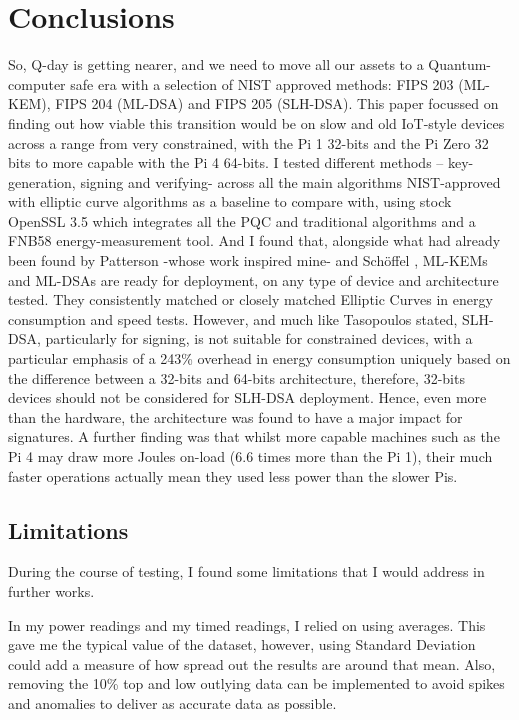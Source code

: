 \documentclass[11pt, letterpaper]{article}
\begin{document}
\section{Conclusions}
So, Q-day is getting nearer, and we need to move all our assets to a Quantum-computer safe era with a selection of NIST approved methods: FIPS 203 (ML-KEM), FIPS 204 (ML-DSA) and FIPS 205 (SLH-DSA). This paper focussed on finding out how viable this transition would be on slow and old IoT-style devices across a range from very constrained, with the Pi 1 32-bits and the Pi Zero 32 bits to more capable with the Pi 4 64-bits. I tested different methods – key-generation, signing and verifying- across all the main algorithms NIST-approved with elliptic curve algorithms as a baseline to compare with, using stock OpenSSL 3.5 which integrates all the PQC and traditional algorithms and a FNB58 energy-measurement tool. And I found that, alongside what had already been found by Patterson \cite{patterson2025energy} -whose work inspired mine- and Schöffel \cite{schoffel2021energy}, ML-KEMs and ML-DSAs are ready for deployment, on any type of device and architecture tested. They consistently matched or closely matched Elliptic Curves in energy consumption and speed tests. However, and much like Tasopoulos \cite{tasopoulos2023energy} stated, SLH-DSA, particularly for signing, is not suitable for constrained devices, with a particular emphasis of a 243\% overhead in energy consumption uniquely based on the difference between a 32-bits and 64-bits architecture, therefore, 32-bits devices should not be considered for SLH-DSA deployment. Hence, even more than the hardware, the architecture was found to have a major impact for signatures. A further finding was that whilst more capable machines such as the Pi 4 may draw more Joules on-load (6.6 times more than the Pi 1), their much faster operations actually mean they used less power than the slower Pis.
\subsection{Limitations}
During the course of testing, I found some limitations that I would address in further works. 

In my power readings and my timed readings, I relied on using averages. This gave me the typical value of the dataset, however, using Standard Deviation could add a measure of how spread out the results are around that mean. Also, removing the 10\% top and low outlying data can be implemented to avoid spikes and anomalies to deliver as accurate data as possible.
\end{document}
